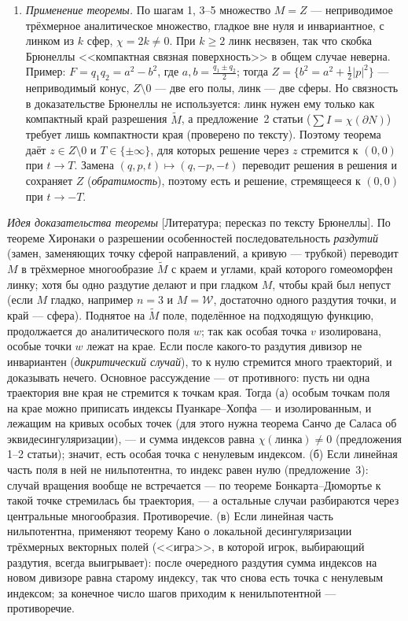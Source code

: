 \documentclass[11pt,a4paper]{article}
\theoremstyle{definition}
\newcommand{\mk}[1]{\textsf{[#1]}}
\newcommand{\term}[1]{\emph{#1}}
\begin{document}
\begin{enumerate}[leftmargin=*,label=\arabic*.]
\item \emph{Применение теоремы.} По шагам 1, 3--5 множество $M=Z$ --- неприводимое трёхмерное
аналитическое множество, гладкое вне нуля и инвариантное, с линком из $k$ сфер, $\chi=2k\ne0$. При
$k\ge2$ линк несвязен, так что скобка Брюнеллы <<компактная связная поверхность>> в общем случае
неверна. Пример: $F=q_1q_2=a^2-b^2$, где $a,b=\frac{q_1\pm q_2}2$; тогда
$Z=\{b^2=a^2+\frac12|p|^2\}$ --- неприводимый конус, $Z\setminus0$ --- две его полы, линк --- две сферы.
Но связность в доказательстве Брюнеллы не используется: линк нужен ему только как компактный край
разрешения $\tilde M$, а предложение~2 статьи ($\sum I=\chi(\partial N)$) требует лишь компактности
края (проверено по тексту). Поэтому теорема даёт $z\in Z\setminus0$ и $T\in\{\pm\infty\}$, для которых
решение через $z$ стремится к $(0,0)$ при $t\to T$. Замена $(q,p,t)\mapsto(q,-p,-t)$ переводит решения в
решения и сохраняет $Z$ (\term{обратимость}), поэтому есть и решение, стремящееся к $(0,0)$ при
$t\to-T$.
\end{enumerate}

\emph{Идея доказательства теоремы} \mk{Литература; пересказ по тексту Брюнеллы}. По теореме
Хиронаки о разрешении особенностей последовательность \term{раздутий} (замен, заменяющих точку
сферой направлений, а кривую --- трубкой) переводит $M$ в трёхмерное многообразие $\tilde M$ с краем
и углами, край которого гомеоморфен линку; хотя бы одно раздутие делают и при гладком $M$, чтобы
край был непуст (если $M$ гладко, например $n=3$ и $M=\mathcal W$, достаточно одного раздутия точки,
и край --- сфера). Поднятое на $\tilde M$ поле, поделённое на подходящую функцию, продолжается до
аналитического поля $w$; так как особая точка $v$ изолирована, особые точки $w$ лежат на крае. Если
после какого-то раздутия дивизор не инвариантен (\term{дикритический случай}), то к нулю стремится
много траекторий, и доказывать нечего. Основное рассуждение --- от противного: пусть ни одна
траектория вне края не стремится к точкам края. Тогда (а) особым точкам поля на крае можно
приписать индексы Пуанкаре--Хопфа --- и изолированным, и лежащим на кривых особых точек (для этого
нужна теорема Санчо де Саласа об эквидесингуляризации), --- и сумма индексов равна
$\chi(\text{линка})\ne0$ (предложения 1--2 статьи); значит, есть особая точка с ненулевым индексом.
(б) Если линейная часть поля в ней не нильпотентна, то индекс равен нулю (предложение~3): случай
вращения вообще не встречается --- по теореме Бонкарта--Дюмортье к такой точке стремилась бы
траектория, --- а остальные случаи разбираются через центральные многообразия. Противоречие.
(в) Если линейная часть нильпотентна, применяют теорему Кано о локальной десингуляризации
трёхмерных векторных полей (<<игра>>, в которой игрок, выбирающий раздутия, всегда выигрывает):
после очередного раздутия сумма индексов на новом дивизоре равна старому индексу, так что снова есть
точка с ненулевым индексом; за конечное число шагов приходим к ненильпотентной --- противоречие.
\end{document}
